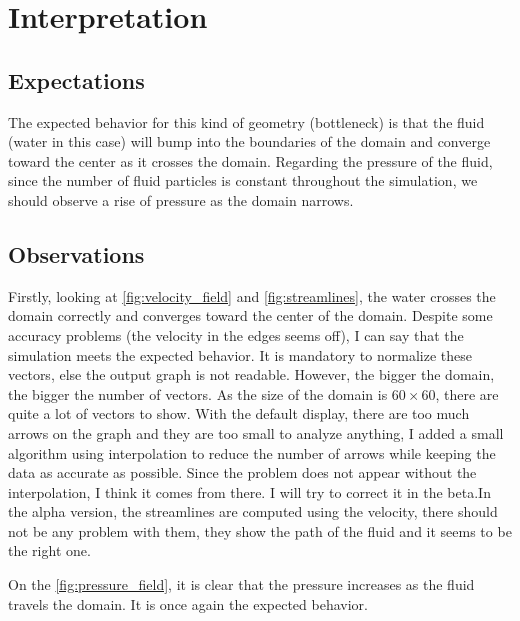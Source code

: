 \section{Interpretation}
\subsection{Expectations}
The expected behavior for this kind of geometry (bottleneck) is that the fluid
(water in this case) will bump into the boundaries of the domain and converge
toward the center as it crosses the domain. Regarding the pressure of the
fluid, since the number of fluid particles is constant throughout the
simulation, we should observe a rise of pressure as the domain narrows.

\subsection{Observations}
Firstly, looking at \autoref{fig:velocity_field} and \autoref{fig:streamlines},
the water crosses the domain correctly and converges toward the center of the
domain. Despite some accuracy problems (the velocity in the edges seems off),
I can say that the simulation meets the expected behavior. It is mandatory to
normalize these vectors, else the output graph is not readable. However, the
bigger the domain, the bigger the number of vectors. As the size of the domain 
is $\num{60} \times \num{60}$, there are quite a lot of vectors to show. With
the default display, there are too much arrows on the graph and they are too
small to analyze anything, I added a small algorithm using interpolation to
reduce the number of arrows while keeping the data as accurate as possible.
Since the problem does not appear without the interpolation, I think it comes
from there. I will try to correct it in the beta.In the alpha version, the
streamlines are computed using the velocity, there should not be any problem
with them, they show the path of the fluid and it seems to be the right one.

\smallbreak{}
On the \autoref{fig:pressure_field}, it is clear that the pressure increases as
the fluid travels the domain. It is once again the expected behavior.



\newpage
\cite{potential-flow}
\newpage
\begin{multicols}{2}
    [\center{\printbibheading}]
    \printbibliography[heading=none]
\end{multicols}
